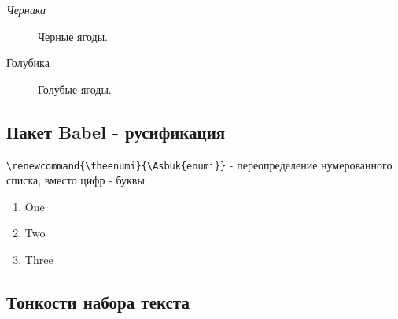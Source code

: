 \documentclass[a4paper,12pt]{article}%
\theoremstyle{plain}%
\theoremstyle{definition}%
\theoremstyle{remark}%
\begin{document}
\begin{description}
\item[\textit{Черника}] Черные ягоды.
\item[Голубика] Голубые ягоды.%
\end{description}



\subsection{Пакет Babel - русификация}

\noindent\verb|\renewcommand{\theenumi}{\Asbuk{enumi}}| - переопределение нумерованного списка, вместо цифр - буквы
\begin{enumerate}
\renewcommand{\theenumi}{\Asbuk{enumi}}
\item One
\item Two
\item Three
\end{enumerate}



\subsection{Тонкости набора текста}
\end{document}
